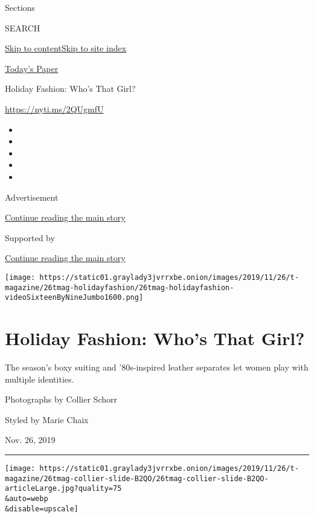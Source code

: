 Sections

SEARCH

\protect\hyperlink{site-content}{Skip to
content}\protect\hyperlink{site-index}{Skip to site index}

\href{https://myaccount.nytimes3xbfgragh.onion/auth/login?response_type=cookie\&client_id=vi}{}

\href{https://www.nytimes3xbfgragh.onion/section/todayspaper}{Today's
Paper}

Holiday Fashion: Who's That Girl?

\url{https://nyti.ms/2QUgmfU}

\begin{itemize}
\item
\item
\item
\item
\item
\end{itemize}

Advertisement

\protect\hyperlink{after-top}{Continue reading the main story}

Supported by

\protect\hyperlink{after-sponsor}{Continue reading the main story}

\texttt{[image: https://static01.graylady3jvrrxbe.onion/images/2019/11/26/t-magazine/26tmag-holidayfashion/26tmag-holidayfashion-videoSixteenByNineJumbo1600.png]}

\hypertarget{holiday-fashion-whos-that-girl}{%
\section{Holiday Fashion: Who's That
Girl?}\label{holiday-fashion-whos-that-girl}}

The season's boxy suiting and '80s-inspired leather separates let women
play with multiple identities.

Photographs by Collier Schorr

Styled by Marie Chaix

Nov. 26, 2019

\begin{center}\rule{0.5\linewidth}{\linethickness}\end{center}

\texttt{[image: https://static01.graylady3jvrrxbe.onion/images/2019/11/26/t-magazine/26tmag-collier-slide-B2QO/26tmag-collier-slide-B2QO-articleLarge.jpg?quality=75\\\&auto=webp\\\&disable=upscale]}

